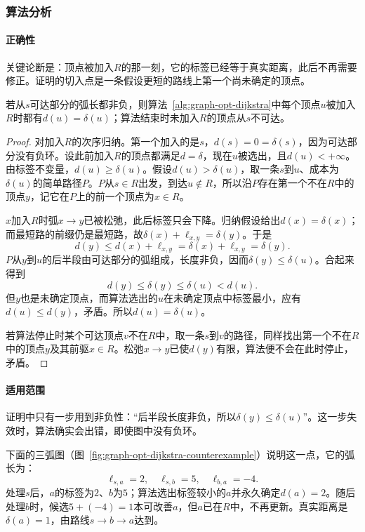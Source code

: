 \subsubsection{算法分析}

\paragraph{正确性}
关键论断是：顶点被加入$R$的那一刻，它的标签已经等于真实距离，此后不再需要修正。证明的切入点是一条假设更短的路线上第一个尚未确定的顶点。

\begin{theorem}[Dijkstra算法的正确性]
\label{thm:graph-opt-dijkstra}
若从$s$可达部分的弧长都非负，则算法~\ref{alg:graph-opt-dijkstra}中每个顶点$u$被加入$R$时都有$d(u)=\delta(u)$；算法结束时未加入$R$的顶点从$s$不可达。
\end{theorem}

\begin{proof}
对加入$R$的次序归纳。第一个加入的是$s$，$d(s)=0=\delta(s)$，因为可达部分没有负环。设此前加入$R$的顶点都满足$d=\delta$，现在$u$被选出，且$d(u)<+\infty$。由标签不变量，$d(u)\geq\delta(u)$。假设$d(u)>\delta(u)$，取一条$s$到$u$、成本为$\delta(u)$的简单路径$P$。$P$从$s\in R$出发，到达$u\notin R$，所以沿$P$存在第一个不在$R$中的顶点$y$，记它在$P$上的前一个顶点为$x\in R$。

$x$加入$R$时弧$x\to y$已被松弛，此后标签只会下降。归纳假设给出$d(x)=\delta(x)$；而最短路的前缀仍是最短路，故$\delta(x)+\ell_{x,y}=\delta(y)$。于是
\[
  d(y)\leq d(x)+\ell_{x,y}=\delta(x)+\ell_{x,y}=\delta(y).
\]
$P$从$y$到$u$的后半段由可达部分的弧组成，长度非负，因而$\delta(y)\leq\delta(u)$。合起来得到
\[
  d(y)\leq\delta(y)\leq\delta(u)<d(u).
\]
但$y$也是未确定顶点，而算法选出的$u$在未确定顶点中标签最小，应有$d(u)\leq d(y)$，矛盾。所以$d(u)=\delta(u)$。

若算法停止时某个可达顶点$v$不在$R$中，取一条$s$到$v$的路径，同样找出第一个不在$R$中的顶点$y$及其前驱$x\in R$。松弛$x\to y$已使$d(y)$有限，算法便不会在此时停止，矛盾。
\end{proof}

\paragraph{适用范围}
证明中只有一步用到非负性：“后半段长度非负，所以$\delta(y)\leq\delta(u)$”。这一步失效时，算法确实会出错，即使图中没有负环。

下面的三弧图（图~\ref{fig:graph-opt-dijkstra-counterexample}）说明这一点，它的弧长为：
\[
  \ell_{s,a}=2,\quad\ell_{s,b}=5,\quad\ell_{b,a}=-4.
\]
处理$s$后，$a$的标签为$2$、$b$为$5$；算法选出标签较小的$a$并永久确定$d(a)=2$。随后处理$b$时，候选$5+(-4)=1$本可改善$a$，但$a$已在$R$中，不再更新。真实距离是$\delta(a)=1$，由路线$s\to b\to a$达到。

